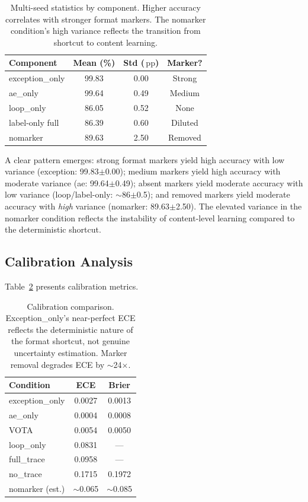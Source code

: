 \documentclass[11pt,a4paper]{article}
\newcommand{\pp}{\,\text{pp}}
\begin{document}
\begin{table}[t]
\centering
\small
\begin{tabular}{lccc}
\toprule
\textbf{Component} & \textbf{Mean (\%)} & \textbf{Std ($\pp$)} & \textbf{Marker?} \\
\midrule
exception\_only & 99.83 & 0.00 & Strong \\
ae\_only & 99.64 & 0.49 & Medium \\
loop\_only & 86.05 & 0.52 & None \\
label-only full & 86.39 & 0.60 & Diluted \\
nomarker & 89.63 & 2.50 & Removed \\
\bottomrule
\end{tabular}
\caption{Multi-seed statistics by component. Higher accuracy correlates with stronger format markers. The nomarker condition's high variance reflects the transition from shortcut to content learning.}
\label{tab:multiseed}
\end{table}

A clear pattern emerges: strong format markers yield high accuracy with low variance (exception: 99.83$\pm$0.00); medium markers yield high accuracy with moderate variance (ae: 99.64$\pm$0.49); absent markers yield moderate accuracy with low variance (loop/label-only: ${\sim}$86$\pm$0.5); and removed markers yield moderate accuracy with \emph{high} variance (nomarker: 89.63$\pm$2.50).
The elevated variance in the nomarker condition reflects the instability of content-level learning compared to the deterministic shortcut.

\subsection{Calibration Analysis}
\label{sec:calibration}

Table~\ref{tab:calibration} presents calibration metrics.

\begin{table}[t]
\centering
\small
\begin{tabular}{lcc}
\toprule
\textbf{Condition} & \textbf{ECE} & \textbf{Brier} \\
\midrule
exception\_only & 0.0027 & 0.0013 \\
ae\_only & 0.0004 & 0.0008 \\
VOTA & 0.0054 & 0.0050 \\
loop\_only & 0.0831 & --- \\
full\_trace & 0.0958 & --- \\
no\_trace & 0.1715 & 0.1972 \\
nomarker (est.) & ${\sim}$0.065 & ${\sim}$0.085 \\
\bottomrule
\end{tabular}
\caption{Calibration comparison. Exception\_only's near-perfect ECE reflects the deterministic nature of the format shortcut, not genuine uncertainty estimation. Marker removal degrades ECE by ${\sim}$24$\times$.}
\label{tab:calibration}
\end{table}
\end{document}
